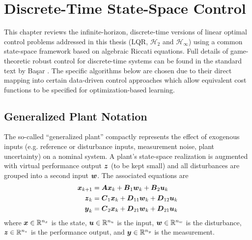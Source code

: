 \chapter{Discrete-Time State-Space Control}
\label{chap:DiscreteControl}
This chapter reviews the infinite-horizon, discrete-time versions of linear optimal control problems addressed in this thesis (LQR, $\mathcal{H}_{2}$ and $\mathcal{H}_{\infty}$) using a common state-space framework based on algebraic Riccati equations.  Full details of game-theoretic robust control for discrete-time systems can be found in the standard text by Ba{\c{s}}ar \cite{bacsar2008h}.  The specific algorithms below are chosen due to their direct mapping into certain data-driven control approaches which allow equivalent cost functions to be specified for optimization-based learning.

\section{Generalized Plant Notation}
The so-called ``generalized plant'' compactly represents the effect of exogenous inputs (e.g. reference or disturbance inputs, measurement noise, plant uncertainty) on a nominal system.  A plant's state-space realization is augmented with virtual performance output $\vb*{z}$ (to be kept small) and all disturbances are grouped into a second input $\vb*{w}$.  The associated equations are
\begin{subequations}
\label{eq:state_space_equations_T0}
\begin{align}
	\vb*{x}_{k+1} &= \vb*{A}\vb*{x}_{k} + \vb*{B}_{1}\vb*{w}_{k} + \vb*{B}_{2}\vb*{u}_{k}\\
	\vb*{z}_{k} &= \vb*{C}_{1}\vb*{x}_{k} + \vb*{D}_{11}\vb*{w}_{k} + \vb*{D}_{12}\vb*{u}_{k}\\
	\vb*{y}_{k} &= \vb*{C}_{2}\vb*{x}_{k} + \vb*{D}_{21}\vb*{w}_{k} + \vb*{D}_{21}\vb*{u}_{k}
\end{align}
\end{subequations}
where $\vb*{x} \in \mathbb{R}^{n_{x}}$ is the state, $\vb*{u} \in \mathbb{R}^{n_{u}}$ is the input, $\vb*{w} \in \mathbb{R}^{n_{w}}$ is the disturbance, $\vb*{z} \in \mathbb{R}^{n_{z}}$ is the performance output, and $\vb*{y} \in \mathbb{R}^{n_{y}}$ is the measurement.

